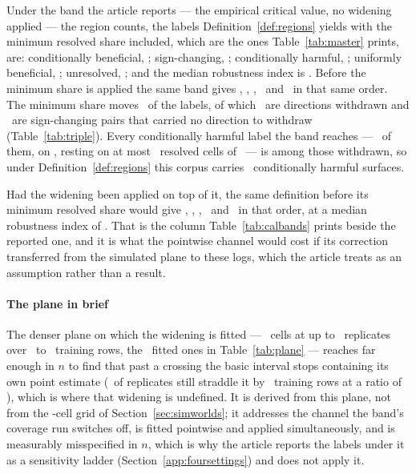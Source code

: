 Under the band the article reports --- the empirical critical value, no
widening applied --- the region counts, the labels
Definition~\ref{def:regions} yields with the minimum resolved share
included, which are the ones Table~\ref{tab:master} prints, are: conditionally beneficial, \nCondBeneficialMinShare; sign-changing,
\nSignChangingMinShare; conditionally harmful, \nCondHarmfulMinShare;
uniformly beneficial, \nUniformlyBeneficialMinShare; unresolved,
\nUnresolvedMinShare; and the median robustness index is \rhoMedian. Before
the minimum share is applied the same band gives \nCondBeneficial,
\nSignChanging, \nCondHarmful, \nUniformlyBeneficial\ and \nUnresolvedPairs\
in that same order. The minimum share moves \nMarkedBelowMinShare\ of the
labels, of which \nLabelsLostToMinShare\ are directions withdrawn and
\nSignChangingBelowMinShare\ are sign-changing pairs that carried no
direction to withdraw (Table~\ref{tab:triple}). Every conditionally
harmful label the band reaches --- \nCondHarmful\ of them, on
\condHarmfulPairs, resting on at most \nCondHarmfulResolvedMax\ resolved cells
of \nHelpdeskFamily\ --- is among those withdrawn, so under
Definition~\ref{def:regions} this corpus carries \nCondHarmfulMinShare\
conditionally harmful surfaces.

\noindent Had the widening been applied on top of it, the same definition
before its minimum resolved share would give \nCondBeneficialCal,
\nSignChangingCal, \nCondHarmfulCal, \nUniformlyBeneficialCal\ and
\nUnresolvedCalibrated\ in that order, at a
median robustness index of \rhoMedianCalibrated. That is the column
Table~\ref{tab:calbands} prints beside the reported one, and it is what the
pointwise channel would cost if its correction transferred from the
simulated plane to these logs, which the article treats as an assumption
rather than a result.

\paragraph{The plane in brief}
The denser plane on which the widening is fitted ---
\nPlaneCellsOffered\ cells at up to \nPlaneReps\ replicates over
\planeNtrainLo\ to \planeNtrainHi\ training rows, the \nPlaneCells\ fitted
ones in Table~\ref{tab:plane} --- reaches far enough in $n$ to find that past a
crossing the basic interval stops containing its own point estimate
(\shareStraddleAtHalfPct\ of replicates still straddle it by
\nStraddleHalfMin\ training rows at a ratio of \straddleRatio), which is
where that widening is undefined. It is derived from this plane, not from the
\nSimGridCells-cell grid of Section~\ref{sec:simworlds}; it addresses the
channel the band's coverage run switches off, is fitted pointwise and applied
simultaneously, and is measurably misspecified in $n$, which is why the
article reports the labels under it as a sensitivity ladder
(Section~\ref{app:foursettings}) and does not apply it.

